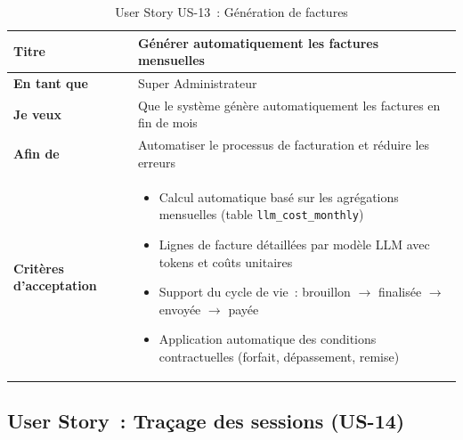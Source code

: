 \begin{table}[H]
\centering
\caption{User Story US-13~: Génération de factures}
\label{tab:us13}
\begin{tabularx}{\textwidth}{|l|X|}
\hline
\textbf{Titre} & Générer automatiquement les factures mensuelles \\
\hline
\textbf{En tant que} & Super Administrateur \\
\hline
\textbf{Je veux} & Que le système génère automatiquement les factures en fin de mois \\
\hline
\textbf{Afin de} & Automatiser le processus de facturation et réduire les erreurs \\
\hline
\textbf{Critères d'acceptation} & \begin{minipage}[t]{\linewidth}\vspace{2pt}
\begin{itemize}[noitemsep,topsep=0pt]
\item Calcul automatique basé sur les agrégations mensuelles (table \texttt{llm\_cost\_monthly})
\item Lignes de facture détaillées par modèle LLM avec tokens et coûts unitaires
\item Support du cycle de vie~: brouillon $\rightarrow$ finalisée $\rightarrow$ envoyée $\rightarrow$ payée
\item Application automatique des conditions contractuelles (forfait, dépassement, remise)
\end{itemize}\vspace{2pt}
\end{minipage} \\
\hline
\end{tabularx}
\end{table}

\subsection{User Story~: Traçage des sessions (US-14)}

